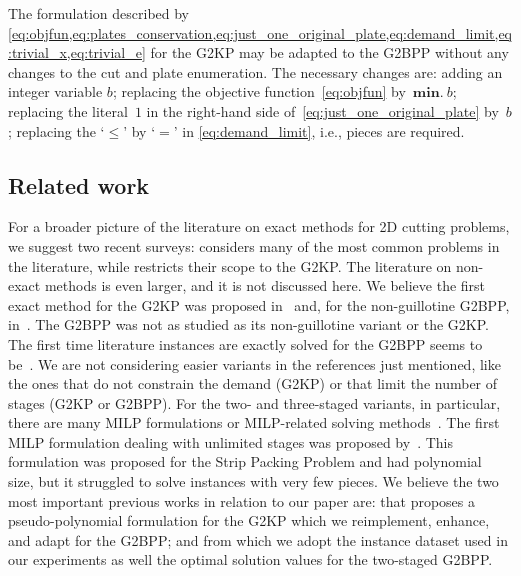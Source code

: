 \documentclass[9pt]{entcs}
\begin{document}
The formulation described by \cref{eq:objfun,eq:plates_conservation,eq:just_one_original_plate,eq:demand_limit,eq:trivial_x,eq:trivial_e} for the G2KP may be adapted to the G2BPP without any changes to the cut and plate enumeration.
The necessary changes are: adding an integer variable \(b\); replacing the objective function~\cref{eq:objfun} by~\(\bm{min.}~b\); replacing the literal~\(1\) in the right-hand side of~\cref{eq:just_one_original_plate} by~\(b\); replacing the `\(\leq\)' by `\(=\)' in \eqref{eq:demand_limit}, i.e., pieces are required.

\subsection{Related work}

For a broader picture of the literature on exact methods for 2D cutting problems, we suggest two recent surveys: \cite{iori:2020} considers many of the most common problems in the literature, while \cite{russo:2020} restricts their scope to the G2KP.
The literature on non-exact methods is even larger, and it is not discussed here.
We believe the first exact method for the G2KP was proposed in~\cite{cw:1977} and, for the non-guillotine G2BPP, in~\cite{martello:1998}.
The G2BPP was not as studied as its non-guillotine variant or the G2KP.
The first time literature instances are exactly solved for the G2BPP seems to be~\cite{pisinger:2007}.
We are not considering easier variants in the references just mentioned, like the ones that do not constrain the demand (G2KP) or that limit the number of stages (G2KP or G2BPP).
For the two- and three-staged variants, in particular, there are many MILP formulations or MILP-related solving methods~\cite{puchinger:2007,silva:2010,macedo:2010,furini:2013,nascimento:2019}.
The first MILP formulation dealing with unlimited stages was proposed by~\cite{messaoud:2008}.
This formulation was proposed for the Strip Packing Problem and had polynomial size, but it struggled to solve instances with very few pieces.
We believe the two most important previous works in relation to our paper are: \cite{furini:2016} that proposes a pseudo-polynomial formulation for the G2KP which we reimplement, enhance, and adapt for the G2BPP; and \cite{silva:2010} from which we adopt the instance dataset used in our experiments as well the optimal solution values for the two-staged G2BPP.
\end{document}
